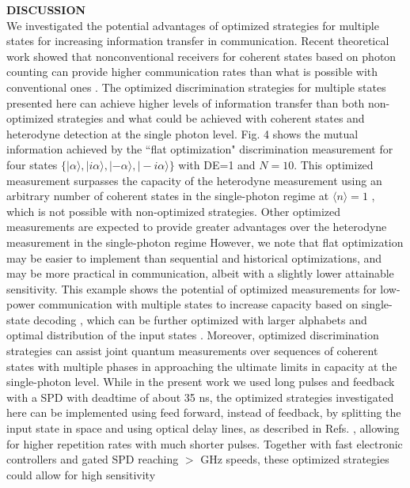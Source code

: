 \documentclass[twocolumn,pra,preprintnumbers,amsmath,amssymb,superscriptaddress,floatfix]{revtex4}%
\begin{document}
\noindent
\textbf{DISCUSSION}
\\
We investigated the potential advantages of optimized strategies
for multiple states for increasing information transfer in communication.
Recent theoretical work showed that nonconventional receivers for
coherent states
based on photon counting can provide higher
communication rates than what is possible with conventional ones
\cite{taeoka14, tan15, lee16}. The optimized discrimination strategies for
multiple states presented here
can achieve higher levels of information
transfer than both non-optimized strategies and what could be achieved
with coherent states and heterodyne detection \cite{lee16} at the single photon level. Fig. 4
shows the mutual information achieved by the ``flat optimization"
discrimination measurement for four states $\{|\alpha\rangle,
|i\alpha\rangle, |-\alpha\rangle, |-i\alpha\rangle\}$ with DE=1 and
$N=10$. This optimized measurement surpasses the capacity of the heterodyne measurement using an arbitrary number
of coherent states in the single-photon regime at $\langle n\rangle=1$ \cite{lee16}, which is not possible with
non-optimized strategies. Other optimized measurements are expected to provide greater
advantages over the heterodyne measurement in the single-photon regime
However, we note that flat optimization may be easier to implement than
sequential and historical optimizations, and may be more practical in communication, albeit
with a slightly lower attainable sensitivity. This example shows the potential of
optimized measurements for low-power communication with multiple
states to increase capacity based on single-state decoding
\cite{shannon48}, which can be further optimized with larger
alphabets and optimal distribution of the input states \cite{lee16}.
Moreover, optimized discrimination  strategies can  assist
joint quantum measurements over sequences of coherent states \cite{guha11,
jarzyna16} with multiple phases \cite{rosati16} in approaching
the ultimate limits in capacity \cite{holevo98, schumacher97}
at the single-photon level.
While in the present work we used long pulses and feedback with a SPD with deadtime of about 35 ns,
the optimized strategies investigated here can be implemented using feed forward, instead of feedback, by
splitting the input state in space and using optical delay lines, as described in Refs. \cite{sych16, becerra11},
allowing for higher repetition rates with much shorter pulses. Together with fast electronic controllers and gated
SPD \cite{bienfang16, zhang15} reaching $>$ GHz speeds, these optimized strategies could allow for high sensitivity
\end{document}
